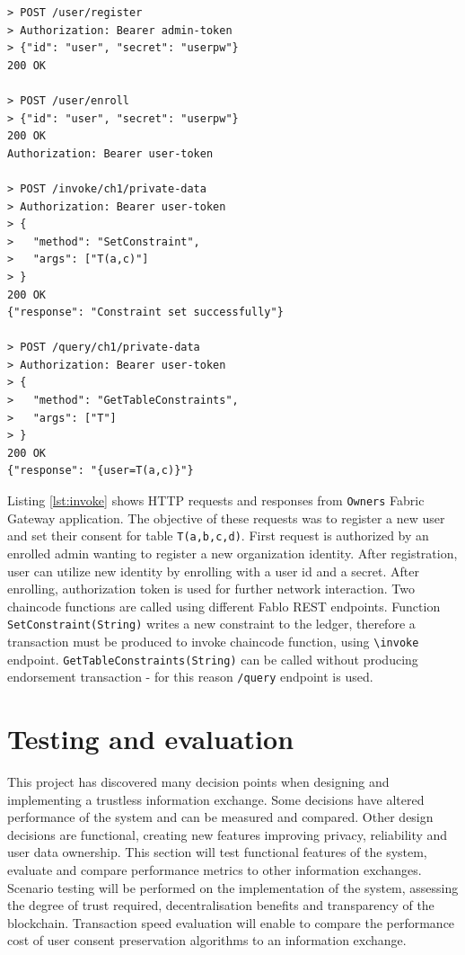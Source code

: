 \documentclass[12pt]{article}
\begin{document}
    \begin{lstlisting}[style=http,
        caption={HTTP requests to issue Owners identities and set constraints}, label={lst:invoke}]
> POST /user/register
> Authorization: Bearer admin-token
> {"id": "user", "secret": "userpw"}
200 OK

> POST /user/enroll
> {"id": "user", "secret": "userpw"}
200 OK
Authorization: Bearer user-token

> POST /invoke/ch1/private-data
> Authorization: Bearer user-token
> {
>   "method": "SetConstraint",
>   "args": ["T(a,c)"]
> }
200 OK
{"response": "Constraint set successfully"}

> POST /query/ch1/private-data
> Authorization: Bearer user-token
> {
>   "method": "GetTableConstraints",
>   "args": ["T"]
> }
200 OK
{"response": "{user=T(a,c)}"}
    \end{lstlisting}

    Listing \ref{lst:invoke} shows HTTP requests and responses from \lstinline{Owners} Fabric Gateway application. The objective of these requests was to register a new user and set their consent for table \lstinline{T(a,b,c,d)}. First request is authorized by an enrolled admin wanting to register a new organization identity. After registration, user can utilize new identity by enrolling with a user id and a secret. After enrolling, authorization token is used for further network interaction. Two chaincode functions are called using different Fablo REST endpoints. Function \lstinline{SetConstraint(String)} writes a new constraint to the ledger, therefore a transaction must be produced to invoke chaincode function, using \lstinline{\invoke} endpoint. \lstinline{GetTableConstraints(String)} can be called without producing endorsement transaction - for this reason \lstinline{/query} endpoint is used.


    \section{Testing and evaluation}
    This project has discovered many decision points when designing and implementing a trustless information exchange. Some decisions have altered performance of the system and can be measured and compared. Other design decisions are functional, creating new features improving privacy, reliability and user data ownership. This section will test functional features of the system, evaluate and compare performance metrics to other information exchanges. Scenario testing will be performed on the implementation of the system, assessing the degree of trust required, decentralisation benefits and transparency of the blockchain. Transaction speed evaluation will enable to compare the performance cost of user consent preservation algorithms to an information exchange.
\end{document}
